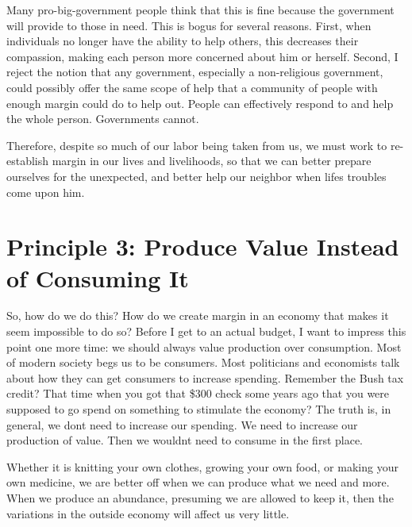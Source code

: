 \documentclass[letterpaper]{article}
\begin{document}
{\color{black}
Many pro-big-government people think that this is fine because the
government will provide to those in need. This is bogus for several
reasons. First, when individuals no longer have the ability to help
others, this decreases
\textcolor[rgb]{0.32941177,0.5529412,0.83137256}{their compassion,
making each person more concerned about him or herself. } Second, I
reject the notion that
a\textcolor[rgb]{0.32941177,0.5529412,0.83137256}{ny} government,
especially a non-religious government, could possibly offer the same
scope of help that \textcolor[rgb]{0.32941177,0.5529412,0.83137256}{a
}community of people with enough margin could do to help out. People
can effectively respond to and help the whole person. Governments
cannot. }

{\color{black}
Therefore, despite so much of our labor being taken from us, we must
work to re-establish margin in our lives and livelihoods, so that we
can better prepare ourselves for the unexpected, and better help our
neighbor when life{\textquotesingle}s troubles come upon him.}

\section{Principle 3: Produce Value Instead of Consuming It}
{\color{black}
\textcolor[rgb]{0.32941177,0.5529412,0.83137256}{So, how do we do this?
How do we create margin in an economy that makes it seem impossible to
do so? Before I get to an actual budget, I want to impress this point
one more time: w}e should always value production over consumption.
Most of modern society
\textcolor[rgb]{0.32941177,0.5529412,0.83137256}{begs} us to be
consumers. Most politicians and economists talk about how they can get
consumers to increase spending.
\textcolor[rgb]{0.32941177,0.5529412,0.83137256}{Remember the Bush tax
credit?  That time when you got that \$300 check some years ago that
you were supposed to go spend on something to stimulate the economy?}
\textcolor[rgb]{0.32941177,0.5529412,0.83137256}{ The truth is, i}n
general, we don{\textquotesingle}t need to increase our spending. We
need to increase our production of value. Then we
wouldn{\textquotesingle}t need to consume in the first place.}

{\color{black}
Whether it is knitting your own clothes, growing your own food, or
making your own medicine, we are better off when we can produce what we
need and more. When we produce an abundance, presuming we are allowed
to keep it, then the variations in the outside economy will affect us
very little. }
\end{document}
